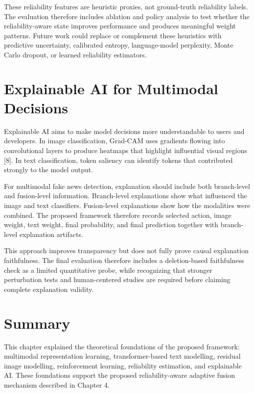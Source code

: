These reliability features are heuristic proxies, not ground-truth reliability labels. The evaluation therefore includes ablation and policy analysis to test whether the reliability-aware state improves performance and produces meaningful weight patterns. Future work could replace or complement these heuristics with predictive uncertainty, calibrated entropy, language-model perplexity, Monte Carlo dropout, or learned reliability estimators.


\section{Explainable AI for Multimodal Decisions}


Explainable AI aims to make model decisions more understandable to users and developers. In image classification, Grad-CAM uses gradients flowing into convolutional layers to produce heatmaps that highlight influential visual regions [8]. In text classification, token saliency can identify tokens that contributed strongly to the model output.


For multimodal fake news detection, explanation should include both branch-level and fusion-level information. Branch-level explanations show what influenced the image and text classifiers. Fusion-level explanations show how the modalities were combined. The proposed framework therefore records selected action, image weight, text weight, final probability, and final prediction together with branch-level explanation artifacts.


This approach improves transparency but does not fully prove causal explanation faithfulness. The final evaluation therefore includes a deletion-based faithfulness check as a limited quantitative probe, while recognizing that stronger perturbation tests and human-centered studies are required before claiming complete explanation validity.


\section{Summary}


This chapter explained the theoretical foundations of the proposed framework: multimodal representation learning, transformer-based text modelling, residual image modelling, reinforcement learning, reliability estimation, and explainable AI. These foundations support the proposed reliability-aware adaptive fusion mechanism described in Chapter 4.

\clearpage
